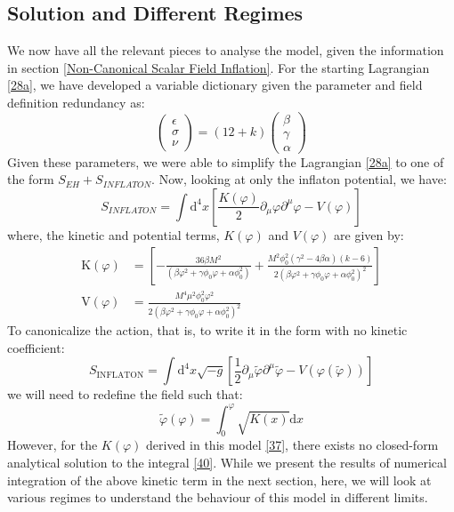 \documentclass[aps,prd,reprint,preprintnumbers,showpacs,floatfix,nofootinbib,superscript address]{revtex4-2}
\begin{document}
\subsection{Solution and Different Regimes}
We now have all the relevant pieces to analyse the model, given the information in section \ref{Non-Canonical Scalar Field Inflation}. For the starting Lagrangian \ref{28a}, we have developed a variable dictionary given the parameter and field definition redundancy as:
\begin{equation} \label{35}
    \begin{pmatrix}
        \epsilon \\ \sigma \\ \nu 
    \end{pmatrix}
    = (12+k)
    \begin{pmatrix}
        \beta \\ \gamma \\ \alpha
    \end{pmatrix}
\end{equation}
Given these parameters, we were able to simplify the Lagrangian \ref{28a} to one of the form $S_{EH} + S_{INFLATON}$. Now, looking at only the inflaton potential, we have: 
\begin{equation}
    S_{INFLATON} = \int \text{d}^4x \left[ \frac{K(\varphi)}{2} \partial_\mu \varphi \partial^\mu \varphi - V(\varphi)\right]
\end{equation}
where, the kinetic and potential terms, $K(\varphi)$ and $V(\varphi)$ are given by:
\begin{align}
    \text{K}(\varphi) &= \left[-\frac{36 \beta M^2}{(\beta \varphi^2 + \gamma\phi_0\varphi + \alpha \phi_0^2)} + \frac{M^2 \phi_0^2 (\gamma^2 - 4\beta\alpha)(k-6)}{2 (\beta \varphi^2 + \gamma\phi_0\varphi + \alpha \phi_0^2)^2}\right] \label{37} \\
    \text{V}(\varphi) &= \frac{ M^4 \mu^2 \phi^2_0 \varphi^2}{2(\beta \varphi^2 + \gamma\phi_0\varphi + \alpha \phi_0^2)^2} \label{38}
\end{align}
To canonicalize the action, that is, to write it in the form with no kinetic coefficient:
\begin{equation}
    S_{\text{INFLATON}} = \int \text{d}^4x \sqrt{-g} \left[ \frac{1}{2}\partial_\mu \tilde{\varphi}\partial^\mu \tilde{\varphi} - V(\varphi(\tilde{\varphi})) \right]
\end{equation}
we will need to redefine the field such that:
\begin{equation} \label{40}
    \tilde{\varphi}(\varphi) = \int_0^{\varphi} \sqrt{K(x)} \text{d}x
\end{equation}
However, for the $K(\varphi)$ derived in this model \ref{37}, there exists no closed-form analytical solution to the integral \ref{40}. While we present the results of numerical integration of the above kinetic term in the next section, here, we will look at various regimes to understand the behaviour of this model in different limits. 
\end{document}
